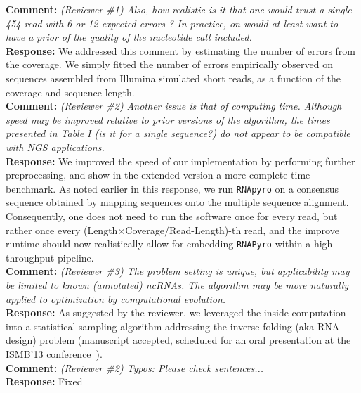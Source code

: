 \documentclass[11pt,hyperref,draft]{article} %
\newcommand{\Answer}[1]{\noindent\textsf{\textbf{Response: }}{\sf#1}\\}
\newcommand{\Comment}[1]{\noindent\textsf{\textbf{Comment: }}{\it#1}\\[.5em]}
\begin{document}
\Comment{(Reviewer \#1) Also, how realistic is it that one would trust a single 454 read with 6 or 12 expected errors ? In practice, on would at least want to have a prior of the quality of the nucleotide call included.}
\Answer{We addressed this comment by estimating the number of errors from the coverage. We simply fitted the number of errors empirically observed on sequences assembled from Illumina simulated short reads, as a function of the coverage and sequence length.}



\Comment{(Reviewer \#2) Another issue is that of computing time. Although speed may be improved relative to prior versions of the algorithm, the times presented in Table I (is it for a single sequence?) do not appear to be compatible with NGS applications.}
\Answer{We improved the speed of our implementation by performing further preprocessing, and show in the extended version a more complete time benchmark. As noted earlier in this response, we run {\tt RNApyro} on a consensus sequence obtained by mapping sequences onto the multiple sequence alignment. Consequently, one does not need to run the software once for every read, but rather once every (Length$\times$Coverage$/$Read-Length)-th read, and the improve runtime should now realistically allow for embedding {\tt RNAPyro} within a high-throughput pipeline.
}



\Comment{(Reviewer \#3) The problem setting is unique, but applicability may be limited to known (annotated) ncRNAs. The algorithm may be more naturally applied to optimization by computational evolution.}
\Answer{As suggested by the reviewer, we leveraged the inside computation into a 	statistical sampling algorithm addressing the inverse folding (aka RNA design) problem (manuscript accepted, scheduled for an oral presentation at the ISMB'13 conference~\cite{Reinharz2013}).}

\Comment{(Reviewer \#2) Typos: Please check sentences...}
\Answer{Fixed}



\end{document}
